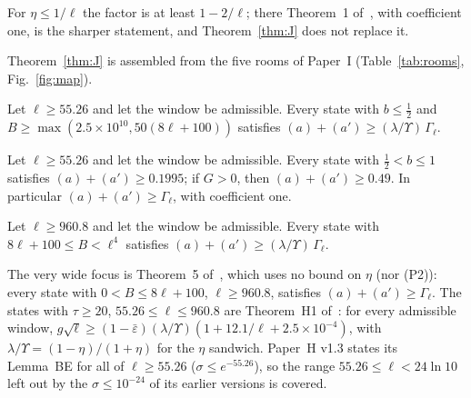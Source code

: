 For $\eta\le1/\ell$ the factor is at least $1-2/\ell$; there Theorem~1 of~\cite{I}, with coefficient one, is the sharper statement, and Theorem~\ref{thm:J} does not replace it.

Theorem~\ref{thm:J} is assembled from the five rooms of Paper~I (Table~\ref{tab:rooms}, Fig.~\ref{fig:map}).

\begin{theorem} 
\label{thm:Jnarrow}
Let $\ell\ge55.26$ and let the window be admissible.
Every state with $b\le\tfrac12$ and $B\ge\max(2.5\times10^{10},50(8\ell+100))$ satisfies $(a)+(a')\ge(\lambda/\Upsilon)\,\Gamma_\ell$.
\end{theorem}

\begin{theorem} \proofst
\label{thm:Jres}
Let $\ell\ge55.26$ and let the window be admissible.
Every state with $\tfrac12<b\le1$ satisfies $(a)+(a')\ge0.1995$; if $G>0$, then $(a)+(a')\ge0.49$.
In particular $(a)+(a')\ge\Gamma_\ell$, with coefficient one.
\end{theorem}

\begin{theorem} 
\label{thm:Jwide}
Let $\ell\ge960.8$ and let the window be admissible.
Every state with $8\ell+100\le B<\ell^4$ satisfies $(a)+(a')\ge(\lambda/\Upsilon)\,\Gamma_\ell$.
\end{theorem}

The very wide focus is Theorem~5 of~\cite{I}, which uses no bound on $\eta$ (nor (P2)): every state with $0<B\le8\ell+100$, $\ell\ge960.8$, satisfies $(a)+(a')\ge\Gamma_\ell$.
The states with $\tau\ge20$, $55.26\le\ell\le960.8$ are Theorem~H1 of~\cite{H}: for every admissible window, $g\sqrt\ell\ge(1-\bar\varepsilon)(\lambda/\Upsilon)(1+12.1/\ell+2.5\times10^{-4})$, with $\lambda/\Upsilon=(1-\eta)/(1+\eta)$ for the $\eta$ sandwich. Paper~H v1.3 states its Lemma~BE for all of $\ell\ge55.26$ ($\sigma\le e^{-55.26}$), so the range $55.26\le\ell<24\ln10$ left out by the $\sigma\le10^{-24}$ of its earlier versions is covered.

